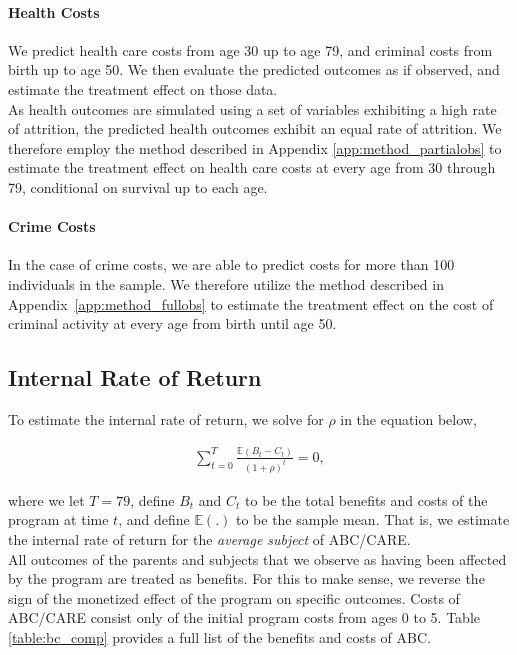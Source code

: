 \paragraph{Health Costs}

\noindent We predict health care costs from age 30 up to age 79, and criminal costs from birth
up to age 50. We then evaluate the predicted outcomes as if observed, and estimate the
treatment effect on those data.\\

\noindent As health outcomes are simulated using a set of variables exhibiting a high rate of attrition, the
predicted health outcomes exhibit an equal rate of attrition. We therefore employ the method described
in Appendix \ref{app:method_partialobs} to estimate the treatment effect on health care costs at
every age from 30 through 79, conditional on survival up to each age. \\

\paragraph{Crime Costs}

\noindent In the case of crime costs, we are able to predict costs for more than 100 individuals in the
sample. We therefore utilize the method described in Appendix~\ref{app:method_fullobs}
to estimate the treatment effect on the cost of criminal activity at every age from birth until age 50. \\

\subsection{Internal Rate of Return}
\label{app:method_irr}

\noindent To estimate the internal rate of return, we solve for $\rho$ in the equation below,

\begin{align}
\sum_{t=0}^T \frac{ \mathbb{E} (B_t - C_t)}{(1+\rho)^t} = 0,
\end{align}

\noindent where we let $T = 79$, define $B_t$ and $C_t$ to be the total benefits and costs of the program at time $t$, and define $\mathbb{E}(.)$ to be the sample mean. That is, we estimate the internal rate of return for the \textit{average subject} of ABC/CARE. \\

\noindent All outcomes of the parents and subjects that we observe as having been affected by the program are treated as benefits. For this to make sense, we reverse the sign of the monetized effect of the program on specific outcomes. Costs of ABC/CARE consist only of the initial program costs from ages 0 to 5. Table \ref{table:bc_comp} provides a full list of the benefits and costs of ABC. \\

